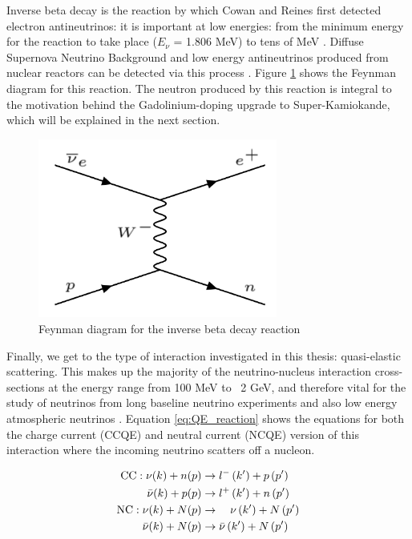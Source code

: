 Inverse beta decay is the reaction by which Cowan and Reines first detected electron antineutrinos: it is important at low energies: from the minimum energy for the reaction to take place ($E_{\nu}$ = 1.806 MeV) to tens of MeV \cite{oralbaev2016inverse}. Diffuse Supernova Neutrino Background and low energy antineutrinos produced from nuclear reactors can be detected via this process \cite{li2022prospects}. Figure \ref{fig:IBD_feynman} shows the Feynman diagram for this reaction. The neutron produced by this reaction is integral to the motivation behind the Gadolinium-doping upgrade to Super-Kamiokande, which will be explained in the next section.

\begin{figure}
    \centering
    \includegraphics[width=0.7\textwidth]{Figures/IBD_feynman.png}
    \caption{Feynman diagram for the inverse beta decay reaction}
    \label{fig:IBD_feynman}
\end{figure}

Finally, we get to the type of interaction investigated in this thesis: quasi-elastic scattering. This makes up the majority of the neutrino-nucleus interaction cross-sections at the energy range from 100 MeV to ~2 GeV, and therefore vital for the study of neutrinos from long baseline neutrino experiments and also low energy atmospheric neutrinos \cite{wan2019measurement}. Equation \ref{eq:QE_reaction} shows the equations for both the charge current (CCQE) and neutral current (NCQE) version of this interaction where the incoming neutrino scatters off a nucleon.


\begin{align} 
\mathrm{CC}: \nu(k)+n(p) & \rightarrow l^{-}\left(k^{\prime}\right)+p\left(p^{\prime}\right) \label{eq:QE_reaction}\\
\bar{\nu}(k)+p(p) & \rightarrow l^{+}\left(k^{\prime}\right)+n\left(p^{\prime}\right) \notag\\
\mathrm{NC}: \nu(k)+N(p) & \rightarrow \quad \nu\left(k^{\prime}\right)+N\left(p^{\prime}\right) \notag \\
\bar{\nu}(k)+N(p) & \rightarrow \bar{\nu}\left(k^{\prime}\right)+N\left(p^{\prime}\right) \notag 
\end{align}



